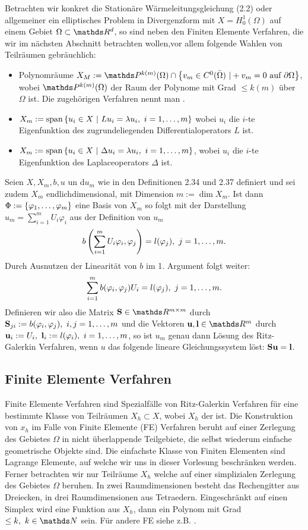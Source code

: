 Betrachten wir konkret die Stationäre Wärmeleitungsgleichung (2.2) oder allgemeiner ein elliptisches Problem in Divergenzform mit $X=H^1_0(\Omega)$ auf einem Gebiet $\Omega\subset \R^d$, so sind neben den Finiten Elemente Verfahren, die wir im nächsten Abschnitt betrachten wollen,vor allem folgende Wahlen von Teilräumen gebräuchlich:
\begin{itemize}
	\item Polynomräume $X_M := \Pw^{k(m)}(\Omega)\cap \penbrace{v_m\in C^0(\bar{\Omega})~|+v_m=0\text{ auf }\partial\Omega}$, wobei $\Pw^{k(m)}(\Omega)$ der Raum der Polynome mit Grad $\le k(m)$ über $\Omega$ ist.
	Die zugehörigen Verfahren nennt man .
	\item $X_m := \operatorname{span} \left\{u_i\in X~|~Lu_i=\lambda u_i,~i=1, \dots ,m\right\}$ wobei $u_i$ die $i$-te Eigenfunktion des zugrundeliegenden Differentialoperators $L$ ist.
	\item $X_m := \operatorname{span} \left\{u_i\in X~|~ \Delta u_i =\lambda u_i,~i=1, \dots ,m\right\}$, wobei $u_i$ die $i$-te Eigenfunktion des Laplaceoperators $\Delta$ ist.
\end{itemize}

Seien $X,X_m,b,u$ un d$u_m$ wie in den Definitionen 2.34 und 2.37 definiert und sei zudem $X_m$ endlichdimensional, mit Dimension $m := \dim X_m$.
Ist dann $\Phi := \left\{\varphi_1, \dots ,\varphi_m\right\}$ eine Basis von $X_m$ so folgt mit der Darstellung $u_m = \sum_{i=1}^{m}U_i\varphi_i$ aus der Definition von $u_m$
\[
b\left( \sum_{i=1}^{m}U_i\varphi_i,\varphi_j\right) = l(\varphi_j),~j=1, \dots ,m.
\]
Durch Ausnutzen der Linearität von $b$ im 1. Argument folgt weiter:
\[
\sum_{i=1}^{m} b(\varphi_i,\varphi_j)U_i = l(\varphi_j),~j=1, \dots ,m.
\]
Definieren wir also die Matrix $\bet{S}\in \R^{m\times m}$ durch $\textbf{S}_{ji} := b(\varphi_i,\varphi_j),~i,j=1, \dots ,m$ und die Vektoren $\bet{u},\bet{l}\in \R^m$ durch $\textbf{u}_i:= U_i,~\textbf{l}_i := l(\varphi_i),~i=1, \dots ,m$, so ist $u_m$ genau dann Lösung des Ritz-Galerkin Verfahren, wenn $u$ das folgende lineare Gleichungssystem löst: $\textbf{Su}=\textbf{l}$.

\subsection{Finite Elemente Verfahren}
Finite Elemente Verfahren sind Spezialfälle von Ritz-Galerkin Verfahren für eine bestimmte Klasse von Teilräumen $X_h\subset X$, wobei $X_h$ der  ist.
Die Konstruktion von $x_h$ im Falle von Finite Elemente (FE) Verfahren beruht auf einer Zerlegung des Gebietes $\Omega$ in nicht überlappende Teilgebiete, die selbst wiederum einfache geometrische Objekte sind.
Die einfachste Klasse von Finiten Elementen sind Lagrange Elemente, auf welche wir uns in dieser Vorlesung beschränken werden.
Ferner betrachten wir nur Teilräume $X_h$ welche auf einer simplizialen Zerlegung des Gebietes $\Omega$ beruhen.
In zwei Raumdimensionen besteht das Rechengitter aus Dreiecken, in drei Raumdimensionen aus Tetraedern.
Eingeschränkt auf einen Simplex wird eine Funktion aus $X_h$, dann ein Polynom mit Grad $\le k,~k\in \N$ sein.
Für andere FE siehe z.B. \cite{BreSco08}.


